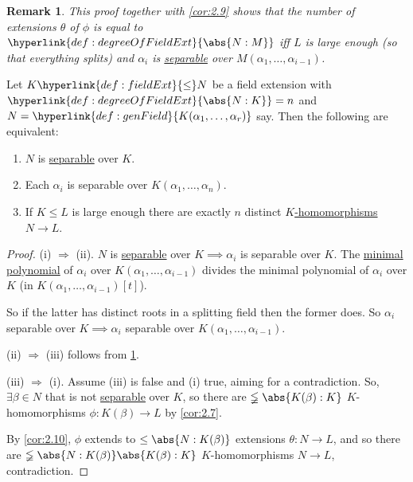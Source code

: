 \documentclass{article}
\newtheorem{nremark}[nthm]{Remark}
\begin{document}
\begin{nremark}\label{rem:2.11}
    This proof together with \cref{cor:2.9} shows that the number of extensions $\theta$ of $\phi$ is equal to $\hyperlink{def:degreeOfFieldExt}{\abs{N:M}}$ iff $L$ is large enough (so that everything splits) and $\alpha_i$ is \hyperlink{def:separableExt}{separable} over \hyperlink{def:genField}{$M(\alpha_1, \dotsc, \alpha_{i-1})$}.
\end{nremark}

\begin{nlemma}\label{lem:2.12}
    Let $K \hyperlink{def:fieldExt}{\leq} N$ be a field extension with $\hyperlink{def:degreeOfFieldExt}{\abs{N:K}} = n$ and $N = \hyperlink{def:genField}{K(\alpha_1, \dotsc, \alpha_r)}$ say.
    Then the following are equivalent:
    \begin{enumerate}[label=(\roman*)]
        \item $N$ is \hyperlink{def:separableExt}{separable} over $K$.
        \item Each $\alpha_i$ is separable over $K(\alpha_1, \dotsc, \alpha_n)$.
        \item If $K \leq L$ is large enough there are exactly $n$ distinct \hyperlink{def:homo}{$K$-homomorphisms} $N \to L$.
    \end{enumerate}
\end{nlemma}

\begin{proof}
    (i) $\Rightarrow$ (ii).
    $N$ is \hyperlink{def:separableExt}{separable} over $K \implies \alpha_i$ is separable over $K$.
    The \hyperlink{def:minimalPoly}{minimal polynomial} of $\alpha_i$ over $K(\alpha_1, \dotsc, \alpha_{i-1})$ divides the minimal polynomial of $\alpha_i$ over $K$ (in $K(\alpha_1, \dotsc, \alpha_{i-1})[t]$).

    So if the latter has distinct roots in a splitting field then the former does.
    So $\alpha_i$ separable over $K \implies \alpha_i$ separable over $K(\alpha_1, \dotsc, \alpha_{i-1})$.

    (ii) $\Rightarrow$ (iii) follows from \cref{rem:2.11}.

    (iii) $\Rightarrow$ (i). Assume (iii) is false and (i) true, aiming for a contradiction.
    So, $\exists \beta \in N$ that is not \hyperlink{def:separableExt}{separable} over $K$, so there are $\lneqq\abs{K(\beta):K}$ $K$-homomorphisms $\phi:K(\beta) \to L$ by \cref{cor:2.7}.

    By \cref{cor:2.10}, $\phi$ extends to $\leq \abs{N:K(\beta)}$ extensions $\theta: N \to L$, and so there are $\lneqq\abs{N:K(\beta)}\abs{K(\beta):K}$ $K$-homomorphisms $N\to L$, contradiction.
\end{proof}
\end{document}
